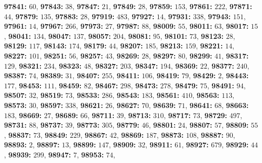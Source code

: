 \textsf{\bfseries 97841:} $60$, \textsf{\bfseries 97843:} $38$, \textsf{\bfseries 97847:} $21$, \textsf{\bfseries 97849:} $28$, \textsf{\bfseries 97859:} $153$, \textsf{\bfseries 97861:} $222$, \textsf{\bfseries 97871:} $44$, \textsf{\bfseries 97879:} $135$, \textsf{\bfseries 97883:} $28$, \textsf{\bfseries 97919:} $483$, \textsf{\bfseries 97927:} $14$, \textsf{\bfseries 97931:} $338$, \textsf{\bfseries 97943:} $151$, \textsf{\bfseries 97961:} $14$, \textsf{\bfseries 97967:} $266$, \textsf{\bfseries 97973:} $27$, \textsf{\bfseries 97987:} $88$, \textsf{\bfseries 98009:} $55$, \textsf{\bfseries 98011:} $63$, \textsf{\bfseries 98017:} $15$, \textsf{\bfseries 98041:} $134$, \textsf{\bfseries 98047:} $137$, \textsf{\bfseries 98057:} $204$, \textsf{\bfseries 98081:} $95$, \textsf{\bfseries 98101:} $73$, \textsf{\bfseries 98123:} $28$, \textsf{\bfseries 98129:} $117$, \textsf{\bfseries 98143:} $174$, \textsf{\bfseries 98179:} $44$, \textsf{\bfseries 98207:} $185$, \textsf{\bfseries 98213:} $159$, \textsf{\bfseries 98221:} $14$, \textsf{\bfseries 98227:} $101$, \textsf{\bfseries 98251:} $56$, \textsf{\bfseries 98257:} $43$, \textsf{\bfseries 98269:} $28$, \textsf{\bfseries 98297:} $80$, \textsf{\bfseries 98299:} $41$, \textsf{\bfseries 98317:} $129$, \textsf{\bfseries 98321:} $234$, \textsf{\bfseries 98323:} $48$, \textsf{\bfseries 98327:} $203$, \textsf{\bfseries 98347:} $194$, \textsf{\bfseries 98369:} $22$, \textsf{\bfseries 98377:} $240$, \textsf{\bfseries 98387:} $74$, \textsf{\bfseries 98389:} $31$, \textsf{\bfseries 98407:} $255$, \textsf{\bfseries 98411:} $106$, \textsf{\bfseries 98419:} $79$, \textsf{\bfseries 98429:} $2$, \textsf{\bfseries 98443:} $177$, \textsf{\bfseries 98453:} $111$, \textsf{\bfseries 98459:} $82$, \textsf{\bfseries 98467:} $298$, \textsf{\bfseries 98473:} $278$, \textsf{\bfseries 98479:} $75$, \textsf{\bfseries 98491:} $94$, \textsf{\bfseries 98507:} $32$, \textsf{\bfseries 98519:} $73$, \textsf{\bfseries 98533:} $286$, \textsf{\bfseries 98543:} $183$, \textsf{\bfseries 98561:} $410$, \textsf{\bfseries 98563:} $113$, \textsf{\bfseries 98573:} $30$, \textsf{\bfseries 98597:} $338$, \textsf{\bfseries 98621:} $26$, \textsf{\bfseries 98627:} $70$, \textsf{\bfseries 98639:} $71$, \textsf{\bfseries 98641:} $68$, \textsf{\bfseries 98663:} $183$, \textsf{\bfseries 98669:} $27$, \textsf{\bfseries 98689:} $66$, \textsf{\bfseries 98711:} $39$, \textsf{\bfseries 98713:} $310$, \textsf{\bfseries 98717:} $73$, \textsf{\bfseries 98729:} $497$, \textsf{\bfseries 98731:} $88$, \textsf{\bfseries 98737:} $39$, \textsf{\bfseries 98773:} $305$, \textsf{\bfseries 98779:} $46$, \textsf{\bfseries 98801:} $24$, \textsf{\bfseries 98807:} $57$, \textsf{\bfseries 98809:} $55$, \textsf{\bfseries 98837:} $73$, \textsf{\bfseries 98849:} $229$, \textsf{\bfseries 98867:} $42$, \textsf{\bfseries 98869:} $187$, \textsf{\bfseries 98873:} $108$, \textsf{\bfseries 98887:} $90$, \textsf{\bfseries 98893:} $2$, \textsf{\bfseries 98897:} $13$, \textsf{\bfseries 98899:} $147$, \textsf{\bfseries 98909:} $32$, \textsf{\bfseries 98911:} $61$, \textsf{\bfseries 98927:} $679$, \textsf{\bfseries 98929:} $44$, \textsf{\bfseries 98939:} $299$, \textsf{\bfseries 98947:} $7$, \textsf{\bfseries 98953:} $74$, 
